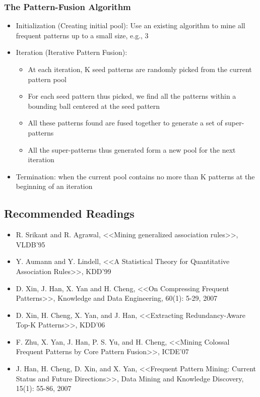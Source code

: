 \subsubsection{The Pattern-Fusion Algorithm}
\begin{itemize}
\item Initialization (Creating initial pool): Use an existing algorithm to mine all frequent patterns up to a small size, e.g., 3
\item Iteration (Iterative Pattern Fusion):
\begin{itemize}
\item At each iteration, K seed patterns are randomly picked from the current pattern
pool
\item For each seed pattern thus picked, we find all the patterns within a bounding ball centered at the seed pattern
\item All these patterns found are fused together to generate a set of super-patterns
\item All the super-patterns thus generated form a new pool for the next iteration
\end{itemize}
\item Termination: when the current pool contains no more than K patterns at the beginning of an iteration
\end{itemize}

\subsection{Recommended Readings}
\begin{itemize}
\item R. Srikant and R. Agrawal, <<Mining generalized association rules>>, VLDB'95
\item Y. Aumann and Y. Lindell, <<A Statistical Theory for Quantitative Association Rules>>, KDD'99
\item D. Xin, J. Han, X. Yan and H. Cheng, <<On Compressing Frequent Patterns>>, Knowledge and Data Engineering, 60(1): 5-29, 2007
\item D. Xin, H. Cheng, X. Yan, and J. Han, <<Extracting Redundancy-Aware Top-K Patterns>>, KDD'06
\item F. Zhu, X. Yan, J. Han, P. S. Yu, and H. Cheng, <<Mining Colossal Frequent Patterns by Core Pattern Fusion>>, ICDE'07
\item J. Han, H. Cheng, D. Xin, and X. Yan, <<Frequent Pattern Mining: Current Status and Future Directions>>, Data Mining and Knowledge Discovery, 15(1): 55-86, 2007
\end{itemize}